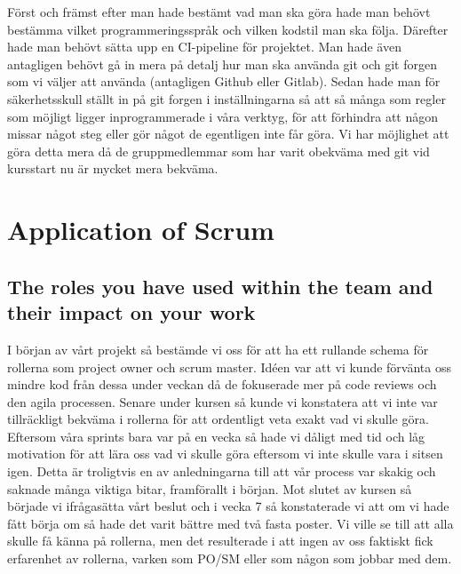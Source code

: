 \documentclass{scrartcl}
\begin{document}


Först och främst efter man hade bestämt vad man ska göra hade man behövt bestämma vilket programmeringsspråk och vilken kodstil man ska följa.
Därefter hade man behövt sätta upp en CI-pipeline för projektet.
Man hade även antagligen behövt gå in mera på detalj hur man ska använda git och git forgen som vi väljer att använda (antagligen Github eller Gitlab).
Sedan hade man för säkerhetsskull ställt in på git forgen i inställningarna så att så många som regler som möjligt ligger inprogrammerade i våra verktyg, för att förhindra att någon missar något steg eller gör något de egentligen inte får göra.
Vi har möjlighet att göra detta mera då de gruppmedlemmar som har varit obekväma med git vid kursstart nu är mycket mera bekväma.

\section{Application of Scrum}
\subsection{The roles you have used within the team and their impact on your work}

I början av vårt projekt så bestämde vi oss för att ha ett rullande schema för rollerna som project owner och scrum master. Idéen var att vi kunde förvänta oss mindre kod från dessa under veckan då de fokuserade mer på code reviews och den agila processen. Senare under kursen så kunde vi konstatera att vi inte var tillräckligt bekväma i rollerna för att ordentligt veta exakt vad vi skulle göra. Eftersom våra sprints bara var på en vecka så hade vi dåligt med tid och låg motivation för att lära oss vad vi skulle göra eftersom vi inte skulle vara i sitsen igen. Detta är troligtvis en av anledningarna till att vår process var skakig och saknade många viktiga bitar, framförallt i början. Mot slutet av kursen så började vi ifrågasätta vårt beslut och i vecka 7 så konstaterade vi att om vi hade fått börja om så hade det varit bättre med två fasta poster. Vi ville se till att alla skulle få känna på rollerna, men det resulterade i att ingen av oss faktiskt fick erfarenhet av rollerna, varken som PO/SM eller som någon som jobbar med dem. 
\end{document}
